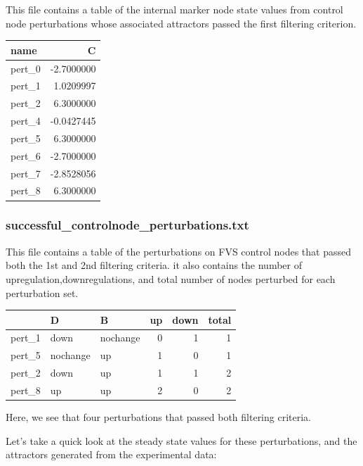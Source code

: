 \documentclass[
]{book}
\begin{document}
This file contains a table of the internal marker node state values from control node perturbations whose associated attractors passed the first filtering criterion.

\begin{tabular}{l|r}
\hline
name & C\\
\hline
pert\_0 & -2.7000000\\
\hline
pert\_1 & 1.0209997\\
\hline
pert\_2 & 6.3000000\\
\hline
pert\_4 & -0.0427445\\
\hline
pert\_5 & 6.3000000\\
\hline
pert\_6 & -2.7000000\\
\hline
pert\_7 & -2.8528056\\
\hline
pert\_8 & 6.3000000\\
\hline
\end{tabular}

\hypertarget{section-id}{%
\subsubsection*{successful\_controlnode\_perturbations.txt}\label{section-id}}

This file contains a table of the perturbations on FVS control nodes that passed both the 1st and 2nd filtering criteria. it also contains the number of upregulation,downregulations, and total number of nodes perturbed for each perturbation set.

\begin{tabular}{l|l|l|r|r|r}
\hline
  & D & B & up & down & total\\
\hline
pert\_1 & down & nochange & 0 & 1 & 1\\
\hline
pert\_5 & nochange & up & 1 & 0 & 1\\
\hline
pert\_2 & down & up & 1 & 1 & 2\\
\hline
pert\_8 & up & up & 2 & 0 & 2\\
\hline
\end{tabular}

Here, we see that four perturbations that passed both filtering criteria.

Let's take a quick look at the steady state values for these perturbations, and the attractors generated from the experimental data:
\end{document}
